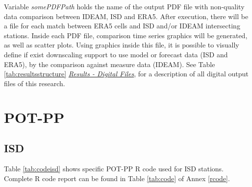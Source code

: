 \documentclass[12pt,oneside]{reedthesis}
\begin{document}
Variable \emph{somePDFPath} holds the name of the output PDF file with non-quality data comparison between IDEAM, ISD and ERA5. After execution, there will be a file for each match between ERA5 cells and ISD and/or IDEAM intersecting stations. Inside each PDF file, comparison time series graphics will be generated, as well as scatter plots. Using graphics inside this file, it is possible to visually define if exist downscaling support to use model or forecast data (ISD and ERA5), by the comparison against measure data (IDEAM). See Table \ref{tab:resultsstructure} \emph{\protect\hyperlink{results}{Results - Digital Files}}, for a description of all digital output files of this research.

\hypertarget{pot-pp-1}{%
\section{POT-PP}\label{pot-pp-1}}

\hypertarget{isd-1}{%
\subsection{ISD}\label{isd-1}}

Table \ref{tab:codeisd} shows specific POT-PP R code used for ISD stations. Complete R code report can be found in Table \ref{tab:code} of Annex \ref{rcode}.
\end{document}
